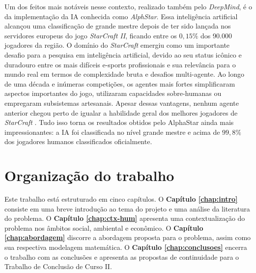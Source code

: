 Um dos feitos mais notáveis nesse contexto, realizado também pelo \textit{DeepMind}, é o da implementação da IA conhecida como \textit{AlphStar}. Essa inteligência artificial alcançou uma classificação de grande mestre depois de ter sido lançada nos servidores europeus do jogo \textit{StarCraft II}, ficando entre os $0,15\%$ dos 90.000 jogadores da região. O domínio do \textit{StarCraft} emergiu como um importante desafio para a pesquisa em inteligência artificial, devido ao seu status icônico e duradouro entre os mais difíceis e-sports profissionais e sua relevância para o mundo real em termos de complexidade bruta e desafios multi-agente. Ao longo de uma década e inúmeras competições, os agentes mais fortes simplificaram aspectos importantes do jogo, utilizaram capacidades sobre-humanas ou empregaram subsistemas artesanais. Apesar dessas vantagens, nenhum agente anterior chegou perto de igualar a habilidade geral dos melhores jogadores de \textit{StarCraft} \cite{vinyals:gm-lv-starcraft}. Tudo isso torna os resultados obtidos pelo AlphaStar ainda mais impressionantes: a IA foi classificada no nível grande mestre e acima de $99,8\%$ dos jogadores humanos classificados oficialmente.




\section{Organização do trabalho} %
\label{sec:organização_do_trabalho}
Este trabalho está estruturado em cinco capítulos. O \textbf{Capítulo \ref{chap:intro}} consiste em uma breve introdução ao tema do projeto e uma análise da literatura do problema. O \textbf{Capítulo \ref{chap:ctx-hum}} apresenta uma contextualização do problema nos âmbitos social, ambiental e econômico. O \textbf{Capítulo \ref{chap:abordagem}} discorre a abordagem proposta para o problema, assim como sua respectiva modelagem matemática. O \textbf{Capítulo \ref{chap:conclusoes}} encerra o trabalho com as conclusões e apresenta as propostas de continuidade para o Trabalho de Conclusão de Curso II.




